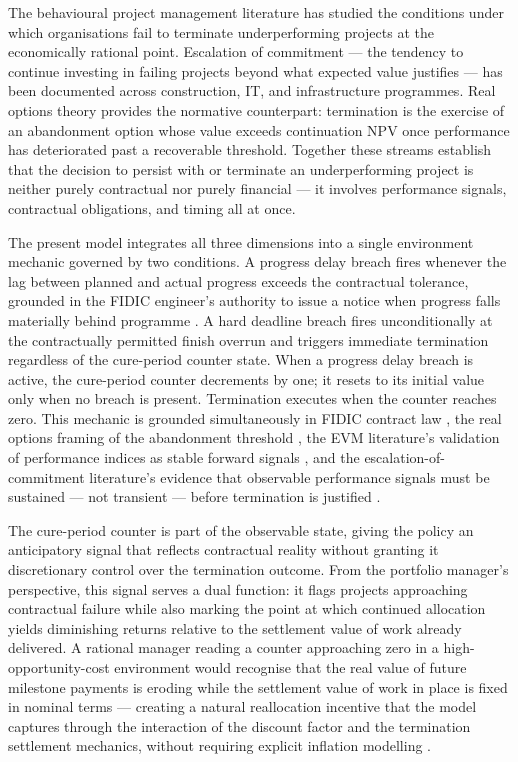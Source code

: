 The behavioural project management literature has studied the
conditions under which organisations fail to terminate underperforming
projects at the economically rational point. Escalation of commitment
\citep{Staw1987} --- the tendency to continue investing in failing
projects beyond what expected value justifies --- has been documented
across construction, IT, and infrastructure programmes. Real options
theory \citep{Dixit1994, Huchzermeier2001} provides the normative
counterpart: termination is the exercise of an abandonment option
whose value exceeds continuation NPV once performance has
deteriorated past a recoverable threshold. Together these streams
establish that the decision to persist with or terminate an
underperforming project is neither purely contractual nor purely
financial --- it involves performance signals, contractual
obligations, and timing all at once.

The present model integrates all three dimensions into a single
environment mechanic governed by two conditions. A progress delay
breach fires whenever the lag between planned and actual progress
exceeds the contractual tolerance, grounded in the FIDIC engineer's
authority to issue a notice when progress falls materially behind
programme \citep{FIDIC2017}. A hard deadline breach fires
unconditionally at the contractually permitted finish overrun and
triggers immediate termination regardless of the cure-period counter
state. When a progress delay breach is active, the cure-period counter
decrements by one; it resets to its initial value only when no breach
is present. Termination executes when the counter reaches zero. This
mechanic is grounded simultaneously in FIDIC contract law
\citep{FIDIC2017, Ndekugri2008}, the real options framing of the
abandonment threshold \citep{Dixit1994, Huchzermeier2001}, the EVM
literature's validation of performance indices as stable forward
signals \citep{christensen1993est, Lipke2003}, and the
escalation-of-commitment literature's evidence that observable
performance signals must be sustained --- not transient --- before
termination is justified \citep{Staw1987}.

The cure-period counter is part of the observable state, giving the
policy an anticipatory signal that reflects contractual reality
without granting it discretionary control over the termination
outcome. From the portfolio manager's perspective, this signal serves
a dual function: it flags projects approaching contractual failure
while also marking the point at which continued allocation yields
diminishing returns relative to the settlement value of work already
delivered. A rational manager reading a counter approaching zero in a
high-opportunity-cost environment would recognise that the real value
of future milestone payments is eroding while the settlement value of
work in place is fixed in nominal terms --- creating a natural
reallocation incentive that the model captures through the interaction
of the discount factor and the termination settlement mechanics,
without requiring explicit inflation modelling \citep{Dixit1994,
FIDIC2017}.


